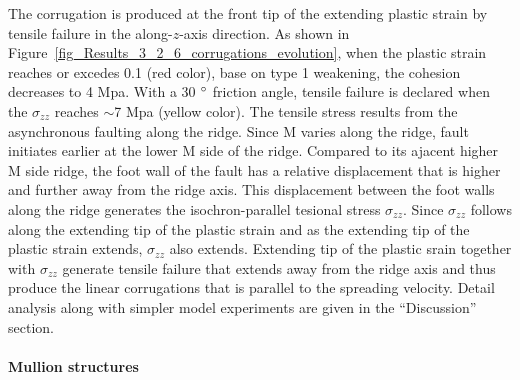 The corrugation is produced at the front tip of the extending plastic strain by tensile failure in the along-$z$-axis direction. As shown in Figure~\hyperref[fig_Results_3_2_6_corrugations_evolution]{\ref{fig_Results_3_2_6_corrugations_evolution}}, when the plastic strain reaches or excedes 0.1 (red color), base on type 1 weakening, the cohesion decreases to 4 Mpa. With a 30 $\degree$ friction angle, tensile failure is declared when the $\sigma_{zz}$ reaches $\sim$7 Mpa (yellow color). The tensile stress results from the asynchronous faulting along the ridge. Since M varies along the ridge, fault initiates earlier at the lower M side of the ridge. Compared to its ajacent higher M side ridge, the foot wall of the fault has a relative displacement that is higher and further away from the ridge axis. This displacement between the foot walls along the ridge generates the isochron-parallel tesional stress $\sigma_{zz}$. Since $\sigma_{zz}$ follows along the extending tip of the plastic strain and as the extending tip of the plastic strain extends, $\sigma_{zz}$ also extends. Extending tip of the plastic srain together with $\sigma_{zz}$ generate tensile failure that extends away from the ridge axis and thus produce the linear corrugations that is parallel to the spreading velocity. Detail analysis along with simpler model experiments are given in the ``Discussion'' section.   

\paragraph{Mullion structures}

